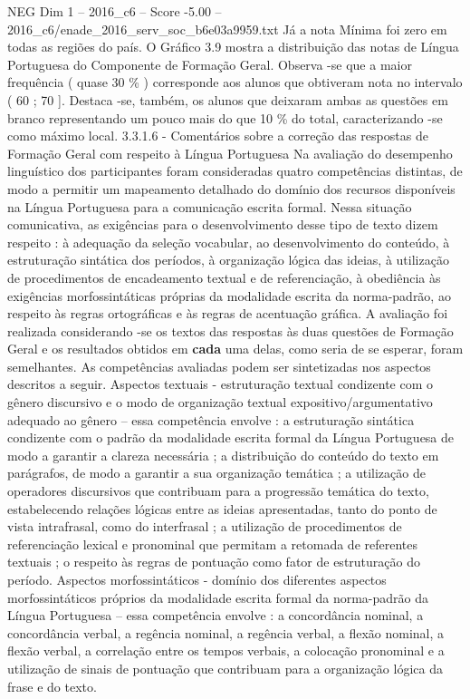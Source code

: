 \begin{textsample}{NEG Dim 1 – 2016\_c6 – Score -5.00 – 2016\_c6/enade\_2016\_serv\_soc\_b6e03a9959.txt}
Já a nota Mínima foi zero em todas as regiões do país.
O Gráfico 3.9 mostra a distribuição das notas de Língua Portuguesa do Componente de Formação Geral.
Observa -se que a maior frequência ( quase 30 \% ) corresponde aos alunos que obtiveram nota no intervalo ( 60 ; 70 ].
Destaca -se, também, os alunos que deixaram ambas as questões em branco representando um pouco mais do que 10 \% do total, caracterizando -se como máximo local. 3.3.1.6 - Comentários sobre a correção das respostas de Formação Geral com respeito à Língua Portuguesa Na avaliação do desempenho linguístico dos participantes foram consideradas quatro competências distintas, de modo a permitir um mapeamento detalhado do domínio dos recursos disponíveis na Língua Portuguesa para a comunicação escrita formal.
Nessa situação comunicativa, as exigências para o desenvolvimento desse tipo de texto dizem respeito : à adequação da seleção vocabular, ao desenvolvimento do conteúdo, à estruturação sintática dos períodos, à organização lógica das ideias, à utilização de procedimentos de encadeamento textual e de referenciação, à obediência às exigências morfossintáticas próprias da modalidade escrita da norma-padrão, ao respeito às regras ortográficas e às regras de acentuação gráfica.
A avaliação foi realizada considerando -se os textos das respostas às duas questões de Formação Geral e os resultados obtidos em \textbf{cada} uma delas, como seria de se esperar, foram semelhantes.
As competências avaliadas podem ser sintetizadas nos aspectos descritos a seguir.
Aspectos textuais - estruturação textual condizente com o gênero discursivo e o modo de organização textual expositivo/argumentativo adequado ao gênero – essa competência envolve : a estruturação sintática condizente com o padrão da modalidade escrita formal da Língua Portuguesa de modo a garantir a clareza necessária ; a distribuição do conteúdo do texto em parágrafos, de modo a garantir a sua organização temática ; a utilização de operadores discursivos que contribuam para a progressão temática do texto, estabelecendo relações lógicas entre as ideias apresentadas, tanto do ponto de vista intrafrasal, como do interfrasal ; a utilização de procedimentos de referenciação lexical e pronominal que permitam a retomada de referentes textuais ; o respeito às regras de pontuação como fator de estruturação do período.
Aspectos morfossintáticos - domínio dos diferentes aspectos morfossintáticos próprios da modalidade escrita formal da norma-padrão da Língua Portuguesa – essa competência envolve : a concordância nominal, a concordância verbal, a regência nominal, a regência verbal, a flexão nominal, a flexão verbal, a correlação entre os tempos verbais, a colocação pronominal e a utilização de sinais de pontuação que contribuam para a organização lógica da frase e do texto.

\end{textsample}
